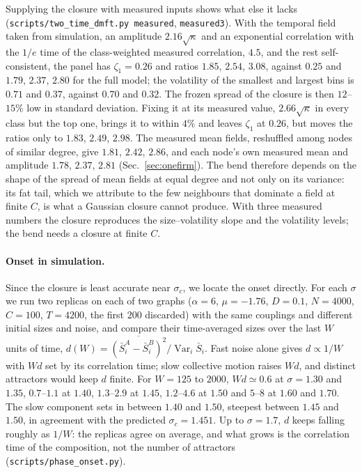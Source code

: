 \documentclass[pre,twocolumn,superscriptaddress,nofootinbib]{revtex4-2}
\newcommand{\Var}{\operatorname{Var}}
\begin{document}
Supplying the closure with measured inputs shows what else it lacks
(\texttt{scripts/two\_time\_dmft.py measured}, \texttt{measured3}).  With the temporal field taken from
simulation, an amplitude $2.16\sqrt\kappa$ and an exponential correlation with the $1/e$ time of the class-weighted
measured correlation, $4.5$,
and the rest self-consistent, the panel has $\zeta_1=0.26$ and ratios $1.85$, $2.54$, $3.08$, against $0.25$ and
$1.79$, $2.37$, $2.80$ for the full model; the volatility of the smallest and largest bins is $0.71$ and $0.37$,
against $0.70$ and $0.32$.  The frozen spread of the closure is then $12$--$15\%$ low in standard deviation.
Fixing it at its measured value, $2.66\sqrt\kappa$ in every class but the top one, brings it to within $4\%$
and leaves $\zeta_1$ at $0.26$, but moves the ratios only to $1.83$, $2.49$, $2.98$.  The measured mean fields,
reshuffled among nodes of similar degree, give $1.81$, $2.42$, $2.86$, and each node's own measured mean and
amplitude $1.78$, $2.37$, $2.81$ (Sec.~\ref{sec:onefirm}).  The bend therefore depends on the shape of the
spread of mean fields at equal degree and not only on its variance: its fat tail, which we attribute to the
few neighbours that dominate a field at finite $C$, is what a Gaussian closure cannot produce.  With three
measured numbers the closure reproduces the size--volatility slope and the volatility levels; the bend needs
a closure at finite $C$.

\paragraph{Onset in simulation.}  Since the closure is least accurate near $\sigma_c$, we locate the onset
directly.  For each $\sigma$ we run two replicas on each of two graphs ($\alpha=6$, $\mu=-1.76$, $D=0.1$,
$N=4000$, $C=100$, $T=4200$, the first $200$ discarded) with the same couplings and different initial sizes and
noise, and compare their time-averaged sizes over the last $W$ units of time,
$d(W)=\overline{(\bar S_i^A-\bar S_i^B)^2}/\Var_i\bar S_i$.  Fast noise alone gives $d\propto1/W$ with $Wd$ set by its
correlation time; slow collective motion raises $Wd$, and distinct attractors would keep $d$ finite.  For
$W=125$ to $2000$, $Wd\simeq0.6$ at $\sigma=1.30$ and $1.35$, $0.7$--$1.1$ at $1.40$, $1.3$--$2.9$ at $1.45$, $1.2$--$4.6$ at
$1.50$ and $5$--$8$ at $1.60$ and $1.70$.  The slow component sets in between $1.40$ and $1.50$, steepest
between $1.45$ and $1.50$, in agreement with the predicted $\sigma_c=1.451$.  Up to $\sigma=1.7$, $d$ keeps falling
roughly as $1/W$: the replicas agree on average, and what grows is the correlation time of the
composition, not the number of attractors (\texttt{scripts/phase\_onset.py}).
\end{document}

